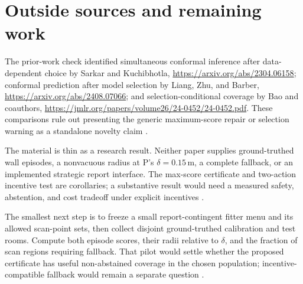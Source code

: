 \documentclass{article}
\begin{document}
\section{Outside sources and remaining work}

The prior-work check identified simultaneous conformal inference after data-dependent choice by Sarkar and Kuchibhotla, \url{https://arxiv.org/abs/2304.06158}; conformal prediction after model selection by Liang, Zhu, and Barber, \url{https://arxiv.org/abs/2408.07066}; and selection-conditional coverage by Bao and coauthors, \url{https://jmlr.org/papers/volume26/24-0452/24-0452.pdf}. These comparisons rule out presenting the generic maximum-score repair or selection warning as a standalone novelty claim .

The material is thin as a research result. Neither paper supplies ground-truthed wall episodes, a nonvacuous radius at P's \(\delta=0.15\,\mathrm m\), a complete fallback, or an implemented strategic report interface. The max-score certificate and two-action incentive test are corollaries; a substantive result would need a measured safety, abstention, and cost tradeoff under explicit incentives .

The smallest next step is to freeze a small report-contingent fitter menu and its allowed scan-point sets, then collect disjoint ground-truthed calibration and test rooms. Compute both episode scores, their radii relative to \(\delta\), and the fraction of scan regions requiring fallback. That pilot would settle whether the proposed certificate has useful non-abstained coverage in the chosen population; incentive-compatible fallback would remain a separate question .
\end{document}
